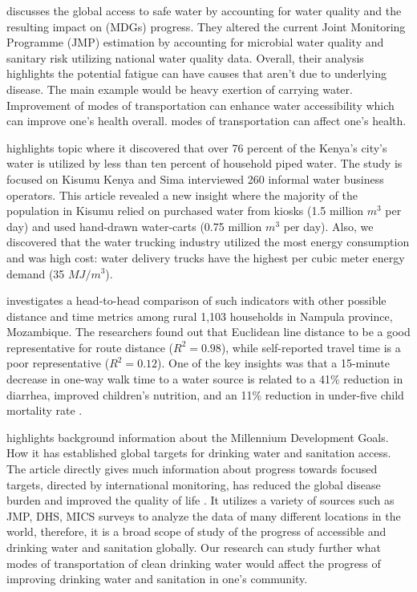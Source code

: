 \documentclass[10pt,twoside]{article}
\numberwithin{equation}{section}
\newcommand{\?}{\stackrel{?}{=}}
\begin{document}
\citet{ondaGlobalAccessSafe2012} discusses the global access to safe water by accounting for water quality and the resulting
impact on (MDGs) progress. They altered the current Joint Monitoring Programme (JMP) estimation by accounting for microbial
water quality and sanitary risk utilizing national water quality data. 
Overall, their analysis highlights the potential fatigue can have causes that aren't due to underlying disease. The main example would be heavy exertion of carrying water.  Improvement of modes of transportation can enhance water accessibility which can improve one's health overall. 
modes of transportation can affect one's health.

\citet{simaWaterFlowsEnergy2013} highlights topic where it discovered that over 76 percent of the Kenya's city's water
is utilized by less than ten percent of household piped water.  The study is focused on Kisumu Kenya and Sima
interviewed 260 informal water business operators. This article revealed a new insight where the majority of the
population in Kisumu relied on purchased water from kiosks (1.5 million $m^{3}$ per day) and used hand-drawn water-carts
(0.75 million $m^{3}$ per day)\citep{simaWaterFlowsEnergy2013}. Also, we discovered that the water trucking industry utilized the
most energy consumption and was high cost: water delivery trucks have the highest per cubic meter energy demand (35
$MJ/m^{3}$)\citep{simaWaterFlowsEnergy2013}. 

\citet{hoChallengeGlobalWater2014} investigates a head-to-head comparison of such indicators with other possible distance and time
metrics among rural 1,103 households in Nampula province, Mozambique. The researchers found out that Euclidean line
distance to be a good representative for route distance ($R^{2} = 0.98$), while self-reported travel time is a poor
representative ($R^{2} = 0.12$). One of the key insights was that a 15-minute decrease in one-way walk time to a water source
is related to a 41\% reduction in diarrhea, improved children's nutrition, and an 11\% reduction in under-five child
mortality rate \citep{hoChallengeGlobalWater2014}. 

\citet{bartramGlobalMonitoringWater2014} highlights background information about the Millennium Development Goals. How it has
established global targets for drinking water and sanitation access. The article directly gives
much information about progress towards focused targets, directed by international monitoring, has reduced the global
disease burden and improved the quality of life \citep{bartramGlobalMonitoringWater2014}. It utilizes a variety of sources such as
JMP, DHS, MICS surveys to analyze the data of many different locations in the world, therefore, it is a broad scope of
study of the progress of accessible and drinking water and sanitation globally. Our research can study further what
modes of transportation of clean drinking water would affect the progress of improving drinking water and sanitation in
one's community. 
\end{document}
